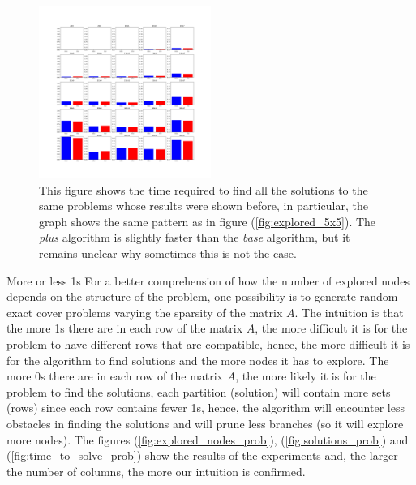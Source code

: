 \documentclass{beamer}
\begin{document}
\begin{frame}{}
    \begin{figure}
        \centering
        \includegraphics[width=0.5\textwidth]{base_star_5x5.pdf}
        \caption{This figure shows the time required to find all the solutions to the same problems
        whose results were shown before, in particular, the graph shows the same pattern as in figure (\ref{fig:explored_5x5}).
        The \textit{plus} algorithm is slightly faster than the \textit{base} algorithm, but it remains unclear
        why sometimes this is not the case.}
        \label{fig:base_star_5x5}
    \end{figure}
\end{frame}

\begin{frame}{More or less 1s}
    For a better comprehension of how the number of explored nodes 
    depends on the structure of the problem, one possibility
    is to generate random exact cover problems varying the sparsity
    of the matrix $A$.
    The intuition is that the more 1s there are in each row
    of the matrix $A$, the more difficult it is for the problem
    to have different rows that are compatible,
    hence, the more difficult it is for the algorithm to find
     solutions and the more nodes it has to explore.
    The more 0s there are in each row of the matrix $A$, the more
    likely it is for the problem to find the solutions,
    each partition (solution) will contain more sets (rows) since each row contains
    fewer 1s, hence, the algorithm will encounter less obstacles
    in finding the solutions and will prune less branches (so it will explore
    more nodes).
    The figures (\ref{fig:explored_nodes_prob}), (\ref{fig:solutions_prob})
    and (\ref{fig:time_to_solve_prob}) show the results of the experiments
    and, the larger the number of columns,
    the more our intuition is confirmed.
\end{frame}
\end{document}
